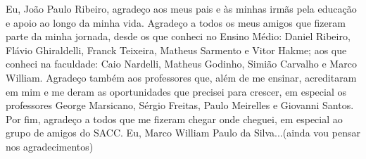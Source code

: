 \begin{agradecimentos}
Eu, João Paulo Ribeiro, agradeço aos meus pais e às minhas irmãs pela educação e apoio ao longo da minha vida. Agradeço a todos os meus amigos que fizeram parte da minha jornada, desde os que conheci no Ensino Médio: Daniel Ribeiro, Flávio Ghiraldelli, Franck Teixeira, Matheus Sarmento e Vitor Hakme; aos que conheci na faculdade: Caio Nardelli, Matheus Godinho, Simião Carvalho e Marco William. Agradeço também aos professores que, além de me ensinar, acreditaram em mim e me deram as oportunidades que precisei para crescer, em especial os professores George Marsicano, Sérgio Freitas, Paulo Meirelles e Giovanni Santos. Por fim, agradeço a todos que me fizeram chegar onde cheguei, em especial ao grupo de amigos do SACC.
Eu, Marco William Paulo da Silva...(ainda vou pensar nos agradecimentos)
\end{agradecimentos}

